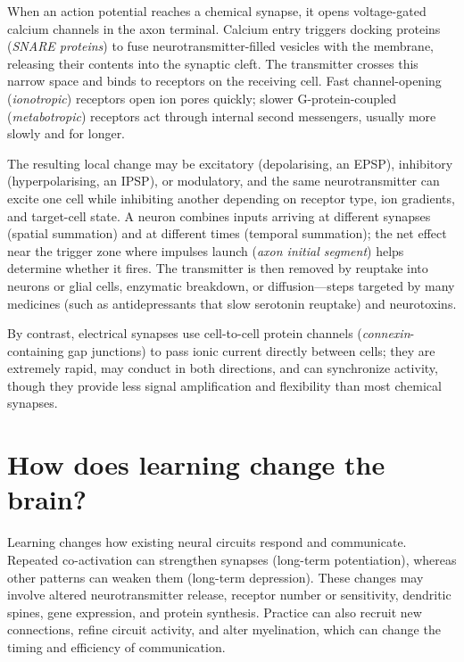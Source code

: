 \documentclass[11pt,oneside]{report}
\begin{document}
When an action potential reaches a chemical synapse, it opens voltage-gated
calcium channels in the axon terminal. Calcium entry triggers docking proteins
(\emph{SNARE proteins}) to fuse neurotransmitter-filled vesicles with the
membrane, releasing their contents into the synaptic cleft. The transmitter
crosses this narrow space and binds to receptors on the receiving cell.
Fast channel-opening (\emph{ionotropic}) receptors open ion pores quickly;
slower G-protein-coupled (\emph{metabotropic}) receptors act through internal
second messengers, usually more slowly and for longer.

The resulting local change may be excitatory (depolarising, an EPSP),
inhibitory (hyperpolarising, an IPSP), or modulatory, and the same
neurotransmitter can excite one cell while inhibiting another depending on
receptor type, ion gradients, and target-cell state. A neuron combines inputs
arriving at different synapses (spatial summation) and at different times
(temporal summation); the net effect near the trigger zone where impulses launch
(\emph{axon initial segment}) helps determine whether it fires. The transmitter
is then removed by reuptake into neurons or glial cells, enzymatic breakdown, or
diffusion—steps targeted by many medicines (such as antidepressants that slow
serotonin reuptake) and neurotoxins.

By contrast, electrical synapses use
cell-to-cell protein channels (\emph{connexin}-containing gap junctions) to pass
ionic current directly between cells; they are extremely rapid, may conduct in
both directions, and can synchronize activity, though they provide less signal
amplification and flexibility than most chemical synapses.

\section{How does learning change the brain?}

Learning changes how existing neural circuits respond and communicate. Repeated
co-activation can strengthen synapses (long-term potentiation), whereas other
patterns can weaken them (long-term depression). These changes may involve
altered neurotransmitter release, receptor number or sensitivity, dendritic
spines, gene expression, and protein synthesis. Practice can also recruit new
connections, refine circuit activity, and alter myelination, which can change
the timing and efficiency of communication.
\end{document}
